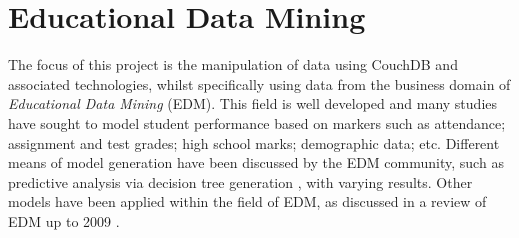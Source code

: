 \section{Educational Data Mining}
The focus of this project is the manipulation of data using CouchDB and associated technologies, whilst specifically using data from the business domain of \textit{Educational Data Mining} (EDM). This field is well developed and many studies have sought to model student performance based on markers such as attendance; assignment and test grades; high school marks; demographic data; etc. Different means of model generation have been discussed by the EDM community, such as predictive analysis via decision tree generation \cite{Qasem20016,Balestra2017,casper2017,Dimitris,zebun2005,Mierle:2005}, with varying results. Other models have been applied within the field of EDM, as discussed in a review of EDM up to 2009 \cite{bakerEdMiningSummary}.